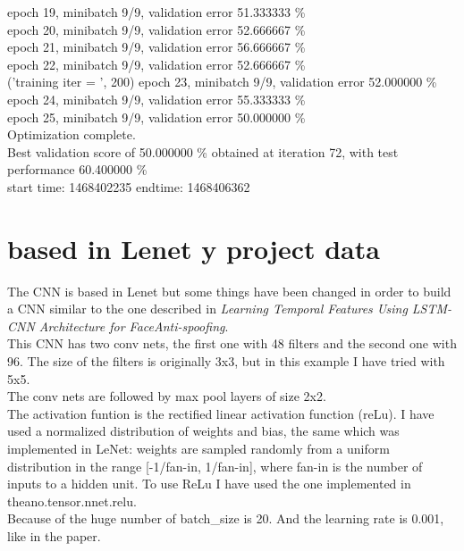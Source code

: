 \documentclass[a4paper]{article}
\begin{document}
epoch 19, minibatch 9/9, validation error 51.333333 \% \\
epoch 20, minibatch 9/9, validation error 52.666667 \% \\
epoch 21, minibatch 9/9, validation error 56.666667 \% \\
epoch 22, minibatch 9/9, validation error 52.666667 \% \\
('training \@ iter = ', 200)
epoch 23, minibatch 9/9, validation error 52.000000 \% \\
epoch 24, minibatch 9/9, validation error 55.333333 \% \\
epoch 25, minibatch 9/9, validation error 50.000000 \% \\
Optimization complete. \\
Best validation score of 50.000000 \%  obtained at iteration 72, with test performance 60.400000 \% \\

start time: 1468402235
endtime: 1468406362


\section{based in Lenet y project data}

The CNN is based in Lenet but some things have been changed in order to build a CNN similar to the one described in \textit{Learning Temporal Features Using LSTM-CNN Architecture for FaceAnti-spoofing}.\\

This CNN has two conv nets, the first one with 48 filters and the second one with 96. The size of the filters is originally 3x3, but in this example I have tried with 5x5.\\

The conv nets are followed by max pool layers of size 2x2.\\

The activation funtion is the rectified linear activation function (reLu). I have used a normalized distribution of weights and bias, the same which was implemented in LeNet: weights are sampled randomly from a uniform distribution in the range [-1/fan-in, 1/fan-in], where fan-in is the number of inputs to a hidden unit. To use ReLu I have used the one implemented in theano.tensor.nnet.relu.\\

Because of the huge number of batch\_size is 20. And the learning rate is 0.001, like in the paper.\\
\end{document}
